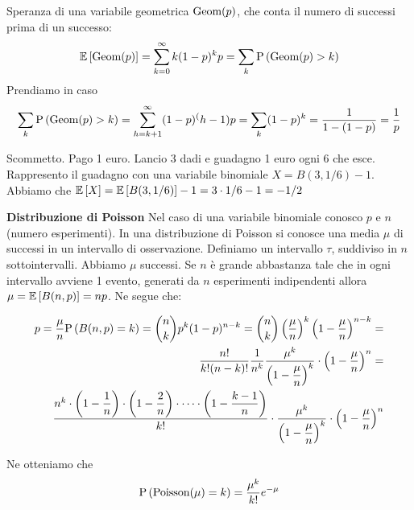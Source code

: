 \begin{defn}
	Speranza di una variabile geometrica $ \text{Geom}(p) $, che conta il numero di successi prima di un successo:
	\begin{equation*}
	\mathbb{E}\left[\text{Geom}(p)\right] = \sum_{k=0}^{\infty} k(1-p)^k p = \sum_{k}\text{P}\left(\text{Geom}(p) > k\right)
	\end{equation*}
	Prendiamo in caso 
	\begin{equation*}
		\sum_{k}\text{P}\left(\text{Geom}(p) > k\right) = \sum_{h=k+1}^{\infty} (1-p)^(h-1)p = \sum_{k}(1-p)^k = \dfrac{1}{1-(1-p)} = \dfrac{1}{p}
	\end{equation*}
\end{defn}


\begin{exmp}
	Scommetto. Pago 1 euro. Lancio 3 dadi e guadagno 1 euro ogni 6 che esce.
	Rappresento il guadagno con una variabile binomiale $ X = B(3,1/6) - 1$. Abbiamo che $ \mathbb{E}\left[X\right] = \mathbb{E}\left[B(3,1/6)\right] - 1 = 3 \cdot 1/6 - 1 = -1/2$
\end{exmp}
		

\begin{defn}
	\textbf{Distribuzione di Poisson}
	Nel caso di una variabile binomiale conosco $ p $ e $ n $ (numero esperimenti).
	In una distribuzione di Poisson si conosce una media $ \mu $ di successi in un intervallo di osservazione.
	Definiamo un intervallo $ \tau $, suddiviso in $ n $ sottointervalli. Abbiamo $ \mu $ successi. Se $ n $ è grande abbastanza tale che in ogni intervallo avviene 1 evento, generati da $ n $ esperimenti indipendenti allora $ \mu = \mathbb{E}\left[B(n,p)\right] = np$. Ne segue che:
	
	\begin{equation*}
	\begin{aligned}
	p = \dfrac{\mu}{n} 
	\text{P}\left(B(n,p) = k\right) = \binom{n}{k}p^k(1-p)^{n-k} = \binom{n}{k} \left(\dfrac{\mu}{n}\right)^k \left(1- \dfrac{\mu}{n}\right)^{n-k} 
	= \\ \dfrac{n!}{k!(n-k)!} \dfrac{1}{n^k} \dfrac{\mu^k}{\left(1-\dfrac{\mu}{n}\right)^k} \cdot \left(1-\dfrac{\mu}{n}\right)^n  
	= \\ \dfrac{n^k \cdot \left(1-\dfrac{1}{n} \right) \cdot \left(1-\dfrac{2}{n}\right) \cdot \dots \cdot \left(1- \dfrac{k-1}{n}\right)}{k!} \cdot \dfrac{\mu^k}{\left(1-\dfrac{\mu}{n}\right)^k} \cdot \left(1-\dfrac{\mu}{n}\right)^n 
	\end{aligned}
	\end{equation*}
	
	Ne otteniamo che 
	\begin{equation}
	\text{P}\left(\text{Poisson}(\mu) = k\right) = \dfrac{\mu^k}{k!} e^{-\mu}
	\end{equation}
	
\end{defn}

